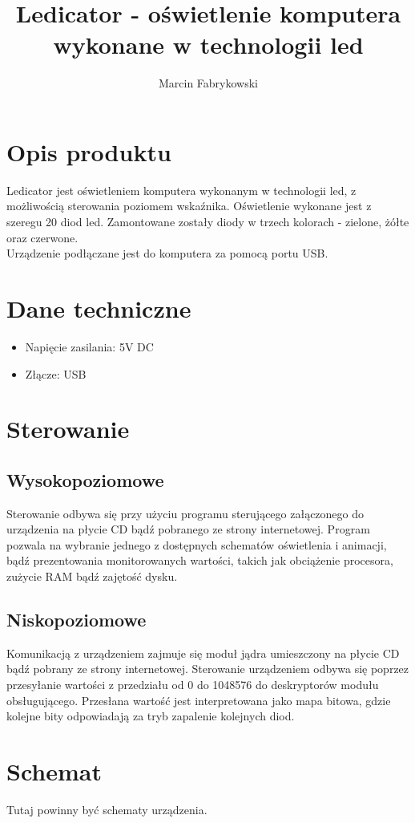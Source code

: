 \documentclass[a4paper,12pt]{article}
\author{Marcin Fabrykowski}
\title{Ledicator - oświetlenie komputera wykonane w technologii led}
\begin{document}
\maketitle
\newpage
\tableofcontents
\newpage
\section{Opis produktu}
	Ledicator jest oświetleniem komputera wykonanym w technologii led, z możliwością sterowania poziomem wskaźnika.
	Oświetlenie wykonane jest z szeregu 20 diod led.
	Zamontowane zostały diody w trzech kolorach - zielone, żółte oraz czerwone.\\
	Urządzenie podłączane jest do komputera za pomocą portu USB.
\section{Dane techniczne}
	\begin{itemize}
		\item Napięcie zasilania: 5V DC
		\item Złącze: USB
	\end{itemize}
\section{Sterowanie}
	\subsection{Wysokopoziomowe}
		Sterowanie odbywa się przy użyciu programu sterującego załączonego do urządzenia na płycie CD bądź pobranego ze strony internetowej.
		Program pozwala na wybranie jednego z dostępnych schematów oświetlenia i animacji, bądź prezentowania monitorowanych wartości, takich jak obciążenie procesora, zużycie RAM bądź zajętość dysku.
	\subsection{Niskopoziomowe}
		Komunikacją z urządzeniem zajmuje się moduł jądra umieszczony na płycie CD bądź pobrany ze strony internetowej.	
		Sterowanie urządzeniem odbywa się poprzez przesyłanie wartości z przedziału od 0 do 1048576 do deskryptorów modułu obsługującego.
		Przesłana wartość jest interpretowana jako mapa bitowa, gdzie kolejne bity odpowiadają za tryb zapalenie kolejnych diod.
\section{Schemat}
	Tutaj powinny być schematy urządzenia.
\newpage
\end{document}
